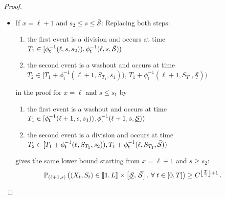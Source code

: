 \documentclass[AHL,Unicode,longabstracts,published]{cedram}
\newcommand{\llbracket}{\mathopen{[\mkern -2.7mu[}}
\newcommand{\rrbracket}{\mathclose{]\mkern -2.7mu]}}
\newcommand{\PP}{\mathbb{P}}
\newcommand{\Smin}{\underline{\mathcal{S}}}
\newcommand{\Smax}{\bar{\mathcal{S}}}
\newcommand{\phit}{\phi_\textsf{t}^{-1}}
\newcommand{\setunL}{\llbracket 1, L\rrbracket}
\newcommand{\1}{\mathbf{1}}
\let\oldforall\forall
\renewcommand*{\forall}{\mathrel{\oldforall}}
\begin{document}
\begin{proof}
\begin{itemize}
\item If $x=\ell+1$ and $s_2\leq s\leq \Smax$: Replacing both steps:
\begin{enumerate}
\item the first event is a division and occurs at time $T_1 \in [\phit(\ell,s,s_2)),\linebreak \phit(\ell,s,\Smax))$
\item the second event is a washout and occurs at time \newline $T_2 \in [T_1+\phit(\ell+1,S_{T_1},s_1)),\, T_1+\phit(\ell+1,S_{T_1},\Smin))$
\end{enumerate}
in the proof for $x=\ell$ and $s\leq s_1$ by
\begin{enumerate}
\item the first event is a washout and occurs at time $T_1 \in [\phit(\ell+1,s,s_1)),\linebreak\phit(\ell+1,s,\Smin))$
\item the second event is a division and occurs at time $T_2 \in [T_1+\phit(\ell,S_{T_1},s_2)),\linebreak T_1+\phit(\ell,S_{T_1},\Smax))$
\end{enumerate}
gives the same lower bound starting from $x=\ell+1$ and $s\geq s_2$:
\begin{align}\label{eq.p.fct.s1s2bis}
\PP_{(\ell+1,s)}
\left(\left(X_t,S_t\right) \in \setunL \times \left[\Smin, \, \Smax\right], \,
\forall t\in[0,T]\right) \geq C^{\left\lfloor\frac{T}{\gamma}\right\rfloor+1}\,.
\end{align}



\end{itemize}
\end{proof}
\end{document}
